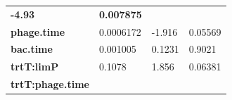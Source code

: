 \documentclass[]{article}
\begin{document}
\begin{longtable}[]{@{}llll@{}}
\begin{minipage}[t]{0.13\columnwidth}
\textbf{-4.93}\strut
\end{minipage} & \begin{minipage}[t]{0.16\columnwidth}\raggedright\strut
\textbf{0.007875}\strut
\end{minipage}\tabularnewline
\begin{minipage}[t]{0.43\columnwidth}\raggedright\strut
\textbf{phage.time}\strut
\end{minipage} & \begin{minipage}[t]{0.17\columnwidth}\raggedright\strut
0.0006172\strut
\end{minipage} & \begin{minipage}[t]{0.13\columnwidth}\raggedright\strut
-1.916\strut
\end{minipage} & \begin{minipage}[t]{0.16\columnwidth}\raggedright\strut
0.05569\strut
\end{minipage}\tabularnewline
\begin{minipage}[t]{0.43\columnwidth}\raggedright\strut
\textbf{bac.time}\strut
\end{minipage} & \begin{minipage}[t]{0.17\columnwidth}\raggedright\strut
0.001005\strut
\end{minipage} & \begin{minipage}[t]{0.13\columnwidth}\raggedright\strut
0.1231\strut
\end{minipage} & \begin{minipage}[t]{0.16\columnwidth}\raggedright\strut
0.9021\strut
\end{minipage}\tabularnewline
\begin{minipage}[t]{0.43\columnwidth}\raggedright\strut
\textbf{trtT:limP}\strut
\end{minipage} & \begin{minipage}[t]{0.17\columnwidth}\raggedright\strut
0.1078\strut
\end{minipage} & \begin{minipage}[t]{0.13\columnwidth}\raggedright\strut
1.856\strut
\end{minipage} & \begin{minipage}[t]{0.16\columnwidth}\raggedright\strut
0.06381\strut
\end{minipage}\tabularnewline
\begin{minipage}[t]{0.43\columnwidth}\raggedright\strut
\textbf{trtT:phage.time}\strut
\end{minipage} & \begin{minipage}[t]{0.17\columnwidth}\raggedright\strut

\end{minipage}
\end{longtable}
\end{document}
